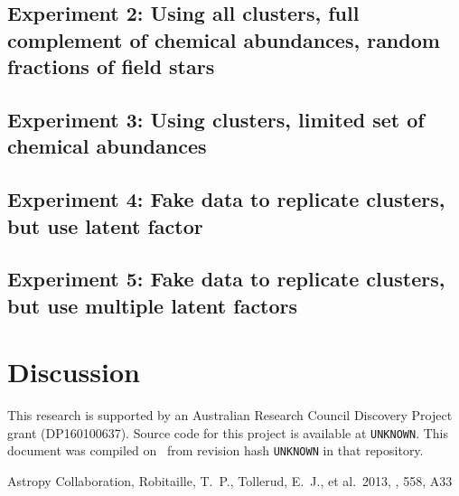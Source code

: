 \documentclass{aastex61}
\newcommand{\githash}{UNKNOWN}
\newcommand{\giturl}{UNKNOWN}}
\begin{document}
\subsection{Experiment 2: Using all clusters, full complement of chemical abundances, random fractions of field stars}

\subsection{Experiment 3: Using clusters, limited set of chemical abundances}

\subsection{Experiment 4: Fake data to replicate clusters, but use latent factor}

\subsection{Experiment 5: Fake data to replicate clusters, but use multiple latent factors}


\section{Discussion}
\label{sec:discussion}


\acknowledgments

This research is supported by an Australian Research Council Discovery Project
grant (DP160100637). 
Source code for this project is available at \texttt{\giturl}. This document
was compiled on \gitdate\ from revision hash \texttt{\githash} in that
repository. 



\begin{thebibliography}{}

 Astropy Collaboration, Robitaille, T.~P., Tollerud, E.~J., et al.\ 2013, \aap, 558, A33 

\end{thebibliography}
\end{document}
